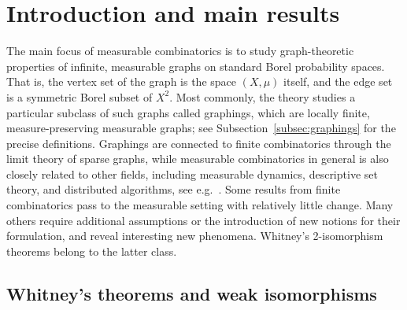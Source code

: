 \documentclass{article}
\theoremstyle{plain}
\theoremstyle{definition}
\begin{document}

\clearpage
\setcounter{tocdepth}{2}
\tableofcontents

\clearpage
\section{Introduction and main results}
\label{sec:uniqueness}


The main focus of measurable combinatorics is to study graph-theoretic properties of infinite, measurable graphs on standard Borel probability spaces. That is, the vertex set of the graph is the space $(X,\mu)$ itself, and the edge set is a symmetric Borel subset of $X^2$. Most commonly, the theory studies a particular subclass of such graphs called graphings, which are locally finite, measure-preserving measurable graphs; see Subsection~\ref{subsec:graphings} for the precise definitions.
Graphings are connected to finite combinatorics through the limit theory of sparse graphs, while measurable combinatorics in general is also closely related to other fields, including measurable dynamics, descriptive set theory, and distributed algorithms, see e.g.\ \cite{lovasz2012large,kechris2016descriptive,BernshteynAlgo}. Some results from finite combinatorics pass to the measurable setting with relatively little change. Many others require additional assumptions or the introduction of new notions for their formulation, and reveal interesting new phenomena. Whitney's 2-isomorphism theorems belong to the latter class.


\subsection{Whitney's theorems and weak isomorphisms}
\end{document}
